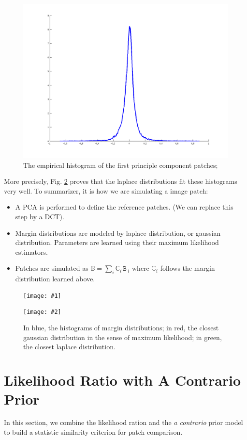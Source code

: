 \documentclass[runningheads]{llncs}
\newcommand{\mat}[1]{\ensuremath{\,\mathtt{#1}\,}}
\newcommand{\rand}[1]{\ensuremath{\mathbb{#1}}}
\newcommand{\insertTwoF}[5]{
  \begin{figure}[h!]
    \centering
    \begin{minipage}{#4\linewidth}
    \texttt{[image: \#1]}
    \end{minipage}
    \begin{minipage}{#4\linewidth}
    \texttt{[image: \#2]}
    \end{minipage}
      \caption{#3}
      \label{#5}
  \end{figure}  
}
\begin{document}
\begin{figure}[!h]
\begin{minipage}{0.3\linewidth}
    \end{minipage}
    \begin{minipage}{0.3\linewidth}
    \includegraphics[width=\linewidth]{h_6}
    \end{minipage}
      \caption{The empirical histogram of the first principle component patches;}
      \label{hist}
  \end{figure}  
More precisely, Fig. \ref{para} proves that the laplace distributions fit these histograms very well. To summarizer, it is how we are simulating a image patch:
\begin{itemize}
 \item A PCA is performed to define the reference patches. (We can replace this step by a DCT).
 \item Margin distributions are modeled by laplace distribution, or gaussian distribution. Parameters are learned using their maximum likelihood estimators.
 \item Patches are simulated as $\rand{B}=\sum_i \rand{C}_i \mat{B}_i$ where $\rand{C}_i$ follows the margin distribution learned above.
\end{itemize}

\insertTwoF{h_2_gau}{h_4_gau}{In blue, the histograms of margin distributions; in red, the closest gaussian distribution in the sense of maximum likelihood; in green, the closest laplace distribution.}{0.45}{para}

\section{Likelihood Ratio with A Contrario Prior}
In this section, we combine the likelihood ration and the \textit{a contrario} prior model to build a statistic similarity criterion for patch comparison.
\end{document}
